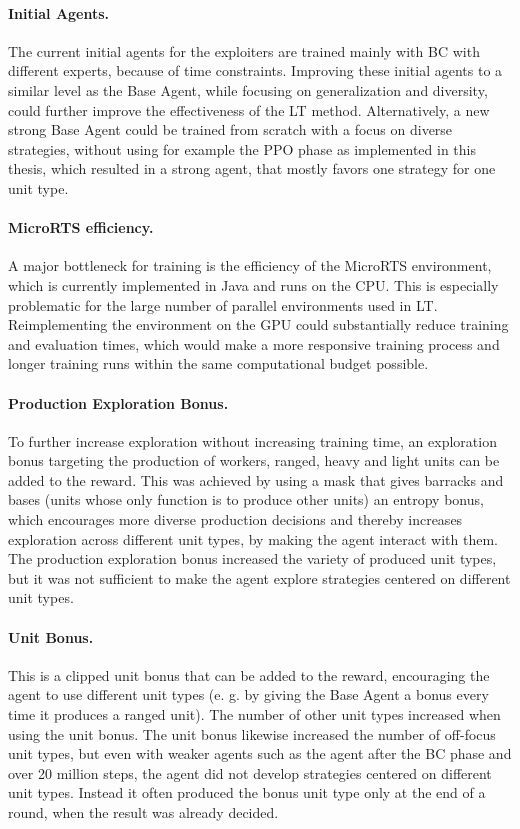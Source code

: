 \documentclass[10pt,twocolumn,letterpaper]{article}
\begin{document}
\paragraph{Initial Agents.}
The current initial agents for the exploiters are trained mainly with BC with different experts, because of time constraints.
Improving these initial agents to a similar level as the Base Agent, while focusing on generalization and diversity, could further improve the effectiveness of the LT method.
Alternatively, a new strong Base Agent could be trained from scratch with a focus on diverse strategies, without using for example the PPO phase as implemented in this thesis, which resulted in a strong agent, that mostly favors one strategy for one unit type.


\paragraph{MicroRTS efficiency.}
A major bottleneck for training is the efficiency of the MicroRTS environment, which is currently implemented in Java and runs on the CPU.
This is especially problematic for the large number of parallel environments used in LT.
Reimplementing the environment on the GPU could substantially reduce training and evaluation times, which would make a more responsive training process and longer training runs within the same computational budget possible.




\paragraph{Production Exploration Bonus.}
To further increase exploration without increasing training time, an exploration bonus targeting the production of workers, ranged, heavy and light units can be added to the reward.
This was achieved by using a mask that gives barracks and bases (units whose only function is to produce other units) an entropy bonus, which encourages more diverse production decisions and thereby increases exploration across different unit types, by making the agent interact with them.
The production exploration bonus increased the variety of produced unit types, but it was not sufficient to make the agent explore strategies centered on different unit types.

\paragraph{Unit Bonus.}
This is a clipped unit bonus that can be added to the reward, encouraging the agent to use different unit types (e. g. by giving the Base Agent a bonus every time it produces a ranged unit).
The number of other unit types increased when using the unit bonus.
The unit bonus likewise increased the number of off-focus unit types, but even with weaker agents such as the agent after the BC phase and over 20 million steps, the agent did not develop strategies centered on different unit types.
Instead it often produced the bonus unit type only at the end of a round, when the result was already decided.
\end{document}
